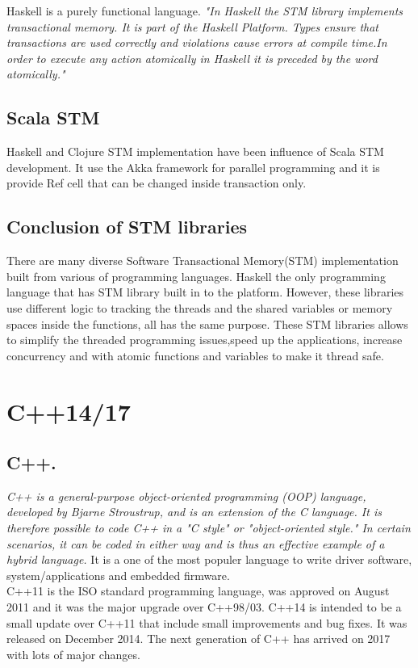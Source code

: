 \documentclass[12pt]{article}
\begin{document}
Haskell is a purely functional language. \textit{"In Haskell the STM library implements transactional memory. It is part of the Haskell Platform. Types ensure that transactions are used correctly and violations cause errors at compile time.In order to execute any action atomically in Haskell it is preceded by the word atomically."}\cite{JIghtuse} 

\subsection{Scala STM}
Haskell and Clojure STM implementation have been influence of Scala STM development. It use the Akka framework for parallel programming and it is provide Ref cell that can be changed inside transaction only.\cite{JIghtuse} 

\subsection{Conclusion of STM libraries}
There are many diverse Software Transactional Memory(STM) implementation built from various of programming languages. Haskell the only programming language that has STM library built in to the platform. However, these libraries use different logic to tracking the threads and the shared variables or memory spaces inside the functions, all has the same purpose. These STM libraries allows to simplify the threaded programming issues,speed up the applications, increase concurrency and with atomic functions and variables to make it thread safe.

\section{C++14/17}
\subsection{C++.}
\textit{C++ is a general-purpose object-oriented programming (OOP) language, developed by Bjarne Stroustrup, and is an extension of the C language. It is therefore possible to code C++ in a "C style" or "object-oriented style." In certain scenarios, it can be coded in either way and is thus an effective example of a hybrid language.}\cite{Techopedia} It is a one of the most populer language to write driver software, system/applications and embedded firmware.\\

C++11 is the ISO standard programming language, was approved on August 2011 and it was the major upgrade over C++98/03. C++14 is intended to be a small update over C++11 that include small improvements and bug fixes. It was released on December 2014. The next generation of C++ has arrived on 2017 with lots of major changes.\\
\end{document}
